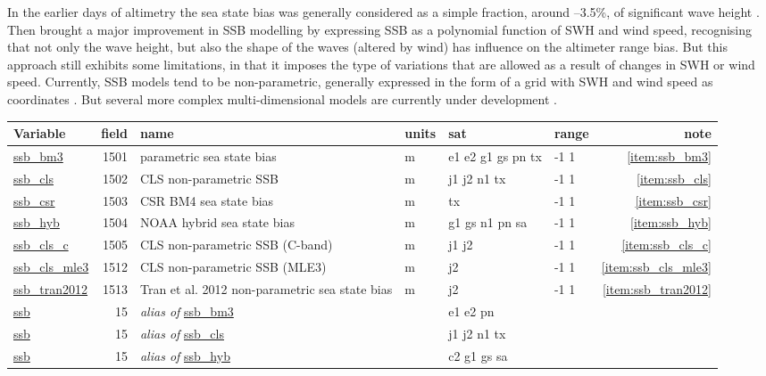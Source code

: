 \documentclass[a4paper,11pt,openany,natbib]{thesis}
\makeatletter
\newcommand\var[1]{\url{#1}\index{variables!#1@\protect\url{#1}}}
\newcommand\alias[1]{\emph{alias of} \var{#1}}
\newenvironment{vartable}{
\begin{table}[ht]
\small
\begin{tabular}{lrllllr}
\hline
Variable & field & name & units & sat & range & note \\
\hline
}{
\hline
\end{tabular}
\end{table}
}
\makeatother
\begin{document}
In the earlier days of altimetry the sea state bias was generally considered as a simple fraction, around --3.5\%, of significant wave height \citep{chelton1994}. Then \citet{gaspar1994a} brought a major improvement in SSB modelling by expressing SSB as a polynomial function of SWH and wind speed, recognising that not only the wave height, but also the shape of the waves (altered by wind) has influence on the altimeter range bias. But this approach still exhibits some limitations, in that it imposes the type of variations that are allowed as a result of changes in SWH or wind speed. Currently, SSB models tend to be non-parametric, generally expressed in the form of a grid with SWH and wind speed as coordinates \citep[e.g.,][]{gaspar1998b}. But several more complex multi-dimensional models are currently under development \citep[e.g.,][]{feng2010,tran2010}.

\begin{vartable}
\var{ssb_bm3} & 1501 & parametric sea state bias & m & e1 e2 g1 gs pn tx & -1 1 & \ref{item:ssb_bm3} \\
\var{ssb_cls} & 1502 & CLS non-parametric SSB & m & j1 j2 n1 tx       & -1 1 & \ref{item:ssb_cls} \\
\var{ssb_csr} & 1503 & CSR BM4 sea state bias & m & tx                & -1 1 & \ref{item:ssb_csr} \\
\var{ssb_hyb} & 1504 & NOAA hybrid sea state bias & m & g1 gs n1 pn sa & -1 1 & \ref{item:ssb_hyb} \\
\var{ssb_cls_c} & 1505 & CLS non-parametric SSB (C-band) & m & j1 j2 & -1 1 & \ref{item:ssb_cls_c} \\
\var{ssb_cls_mle3} & 1512 & CLS non-parametric SSB (MLE3) & m & j2      & -1 1 & \ref{item:ssb_cls_mle3} \\
\var{ssb_tran2012} & 1513 & Tran et al. 2012 non-parametric sea state bias & m & j2 & -1 1 & \ref{item:ssb_tran2012} \\
\hline
\var{ssb}     &   15 & \alias{ssb_bm3} && e1 e2 pn && \\
\var{ssb}     &   15 & \alias{ssb_cls} && j1 j2 n1 tx && \\
\var{ssb}     &   15 & \alias{ssb_hyb} && c2 g1 gs sa && \\
\end{vartable}
\end{document}
